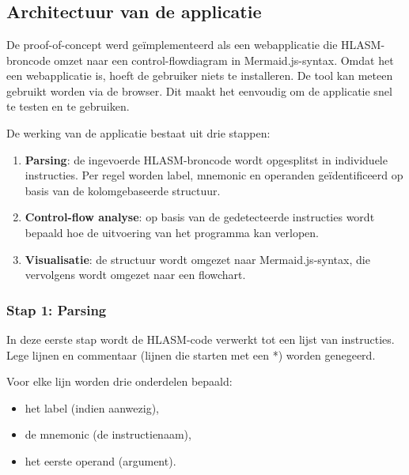 \chapter{}%
\label{ch:poc}

\section{Architectuur van de applicatie}

De proof-of-concept werd geïmplementeerd als een webapplicatie die HLASM-broncode omzet naar een control-flowdiagram in Mermaid.js-syntax.
Omdat het een webapplicatie is, hoeft de gebruiker niets te installeren.  
De tool kan meteen gebruikt worden via de browser. Dit maakt het eenvoudig om de applicatie snel te testen en te gebruiken.

De werking van de applicatie bestaat uit drie stappen:

\begin{enumerate}
    \item \textbf{Parsing}: de ingevoerde HLASM-broncode wordt opgesplitst in individuele instructies. Per regel worden label, mnemonic en operanden geïdentificeerd op basis van de kolomgebaseerde structuur.
    
    \item \textbf{Control-flow analyse}: op basis van de gedetecteerde instructies wordt bepaald hoe de uitvoering van het programma kan verlopen.
    
    \item \textbf{Visualisatie}: de structuur wordt omgezet naar Mermaid.js-syntax, die vervolgens wordt omgezet naar een flowchart.
\end{enumerate}

\newpage

\subsection{Stap 1: Parsing}

In deze eerste stap wordt de HLASM-code verwerkt tot een lijst van instructies.
Lege lijnen en commentaar (lijnen die starten met een *) worden genegeerd.

Voor elke lijn worden drie onderdelen bepaald:
\begin{itemize}
    \item het label (indien aanwezig),
    \item de mnemonic (de instructienaam),
    \item het eerste operand (argument).
\end{itemize}

